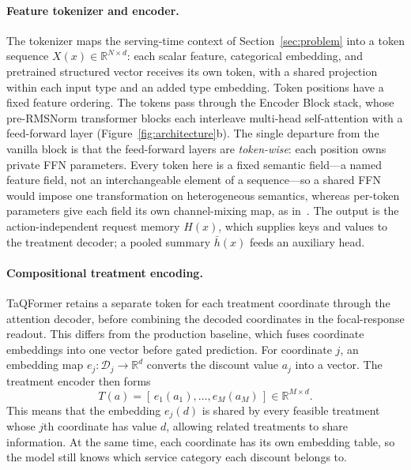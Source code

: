 \documentclass[sigconf,nonacm]{acmart}
\newcommand{\model}{TaQFormer\xspace}
\begin{document}
\paragraph{Feature tokenizer and encoder.}
The tokenizer maps the serving-time context of Section~\ref{sec:problem} into a token sequence $X(x)\in\mathbb R^{N\times d}$: each scalar feature, categorical embedding, and pretrained structured vector receives its own token, with a shared projection within each input type and an added type embedding. Token positions have a fixed feature ordering. The tokens pass through the Encoder Block stack, whose pre-RMSNorm transformer blocks each interleave multi-head self-attention with a feed-forward layer (Figure~\ref{fig:architecture}b). The single departure from the vanilla block is that the feed-forward layers are \emph{token-wise}: each position owns private FFN parameters. Every token here is a fixed semantic field---a named feature field, not an interchangeable element of a sequence---so a shared FFN would impose one transformation on heterogeneous semantics, whereas per-token parameters give each field its own channel-mixing map, as in~\cite{zhang2025onetrans,zhu2025rankmixer}. The output is the action-independent request memory $H(x)$, which supplies keys and values to the treatment decoder; a pooled summary $\bar h(x)$ feeds an auxiliary head.

\paragraph{Compositional treatment encoding.}
\model retains a separate token for each treatment coordinate through the attention decoder, before combining the decoded coordinates in the focal-response readout. This differs from the production baseline, which fuses coordinate embeddings into one vector before gated prediction. For coordinate $j$, an embedding map
$e_j:\mathcal D_j\to\mathbb R^d$ converts the discount value $a_j$ into a vector. The treatment encoder then forms
\begin{equation}
    T(a) = [\,e_1(a_1),\dots,e_M(a_M)\,] \in \mathbb R^{M\times d}.
\end{equation}
This means that the embedding $e_j(d)$ is shared by every feasible treatment whose $j$th coordinate has value $d$, allowing related treatments to share information. At the same time, each coordinate has its own embedding table, so the model still knows which service category each discount belongs to.
\end{document}

